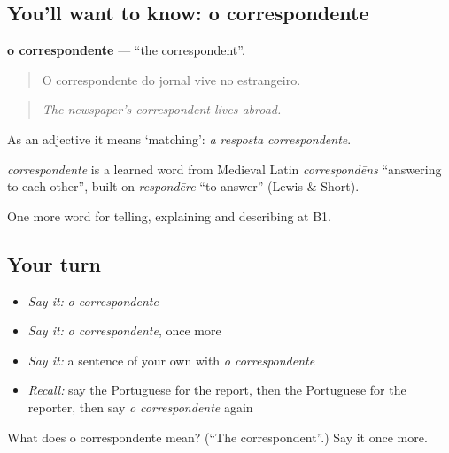 \subsection*{You'll want to know: o correspondente}
\textbf{o correspondente} — \textquotedblleft{}the correspondent\textquotedblright{}.

\begin{quote}
O correspondente do jornal vive no estrangeiro.
\end{quote}

\begin{quote}
\emph{The newspaper’s correspondent lives abroad.}
\end{quote}

As an adjective it means ‘matching’: \emph{a resposta correspondente}.

\begin{cousinweb}
\emph{correspondente} is a learned word from Medieval Latin \emph{correspondēns} \textquotedblleft{}answering to each other\textquotedblright{}, built on \emph{respondēre} \textquotedblleft{}to answer\textquotedblright{} (Lewis \& Short).
\end{cousinweb}

\begin{grammarlens}[title={What you've built}]
One more word for telling, explaining and describing at B1.
\end{grammarlens}

\subsection*{Your turn}
\begin{itemize}
\raggedright
  \item \emph{Say it:} \emph{o correspondente}
  \item \emph{Say it:} \emph{o correspondente}, once more
  \item \emph{Say it:} a sentence of your own with \emph{o correspondente}
  \item \emph{Recall:} say the Portuguese for the report, then the Portuguese for the reporter, then say \emph{o correspondente} again
\end{itemize}

\begin{tcolorbox}[breakable,colback=teal!4,colframe=teal!35!black,title={Before you move on}]
What does o correspondente mean? (\textquotedblleft{}The correspondent\textquotedblright{}.) Say it once more.
\end{tcolorbox}
